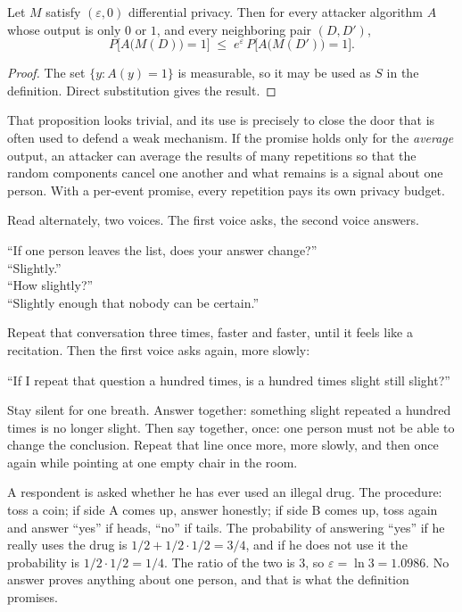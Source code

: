 \begin{proposisi}
Let $M$ satisfy $(\varepsilon,0)$ differential privacy. Then for every attacker
algorithm $A$ whose output is only $0$ or $1$, and every neighboring pair $(D,D')$,
\begin{equation}
P\bigl[A\bigl(M(D)\bigr)=1\bigr] \;\le\; e^{\varepsilon}\,
P\bigl[A\bigl(M(D')\bigr)=1\bigr] .
\end{equation}
\end{proposisi}

\begin{proof}
The set $\{y : A(y)=1\}$ is measurable, so it may be used as $S$ in the definition.
Direct substitution gives the result.
\end{proof}

That proposition looks trivial, and its use is precisely to close the door that is often
used to defend a weak mechanism. If the promise holds only for the \emph{average} output,
an attacker can average the results of many repetitions so that the random components
cancel one another and what remains is a signal about one person. With a per-event
promise, every repetition pays its own privacy budget.

\begin{bacakeras}
Read alternately, two voices. The first voice asks, the second voice answers.

``If one person leaves the list, does your answer change?''\\
``Slightly.''\\
``How slightly?''\\
``Slightly enough that nobody can be certain.''

Repeat that conversation three times, faster and faster, until it feels like a
recitation. Then the first voice asks again, more slowly:

``If I repeat that question a hundred times, is a hundred times slight still slight?''

Stay silent for one breath. Answer together: something slight repeated a hundred times
is no longer slight. Then say together, once: one person must not be able to change the
conclusion. Repeat that line once more, more slowly, and then once again while pointing
at one empty chair in the room.
\end{bacakeras}

\begin{contoh}
A respondent is asked whether he has ever used an illegal drug. The procedure: toss a
coin; if side A comes up, answer honestly; if side B comes up, toss again and answer
``yes'' if heads, ``no'' if tails. The probability of answering ``yes'' if he really uses
the drug is $1/2+1/2\cdot 1/2=3/4$, and if he does not use it the probability is
$1/2\cdot 1/2=1/4$. The ratio of the two is $3$, so $\varepsilon=\ln 3=1.0986$. No answer
proves anything about one person, and that is what the definition promises.
\end{contoh}

